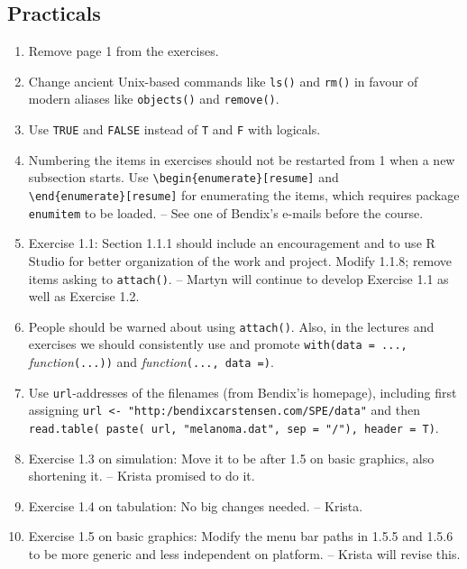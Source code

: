 \subsection*{Practicals}
\begin{enumerate}
\item Remove page 1 from the exercises.
\item Change ancient Unix-based commands like
 \texttt{ls()} and \texttt{rm()} in favour of modern aliases like  \texttt{objects()}
and \texttt{remove()}.
\item Use \texttt{TRUE} and \texttt{FALSE} instead of \texttt{T} and \texttt{F}
with logicals.
\item Numbering the items in exercises should not be restarted from 1 when a new subsection
starts. Use \verb|\begin{enumerate}[resume]| and \\ \verb|\end{enumerate}[resume]| 
for enumerating the items, which requires package \texttt{enumitem}
to be loaded. -- 
See one of Bendix's e-mails before the course.
\item Exercise 1.1: Section 1.1.1 should include an encouragement and 
to use R Studio for better organization of the work and project. 
Modify 1.1.8; remove items asking to \texttt{attach()}. -- Martyn will continue
to develop Exercise 1.1 as well as Exercise 1.2.
\item People should be warned about using \texttt{attach()}. Also,
   in the lectures and exercises we should consistently use and promote 
	\texttt{with(data = ...,} \textit{function}\texttt{(...))} and 
	 \textit{function}\texttt{(..., data =)}.	
\item Use \texttt{url}-addresses of the filenames (from Bendix'is homepage), including
first assigning \verb|url <- "http:/bendixcarstensen.com/SPE/data"| and then 
\verb|read.table( paste( url, "melanoma.dat", sep = "/"), header = T)|. 
\item Exercise 1.3 on simulation: Move it to be after 1.5 on basic graphics, also shortening
it. -- Krista promised to do it.
\item Exercise 1.4 on tabulation: No big changes needed. -- Krista.
\item Exercise 1.5 on basic graphics: Modify  the menu bar paths in 1.5.5 and 1.5.6
to be more generic and less independent on platform. -- Krista will revise this. 

\end{enumerate}
